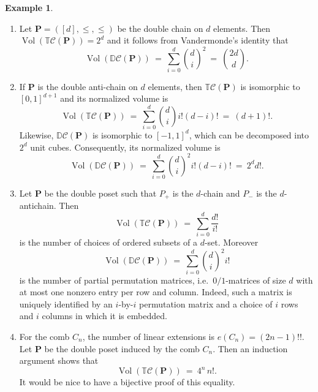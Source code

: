 \documentclass[11pt]{amsart}
\theoremstyle{definition}
\newtheorem{example}{Example}
\begin{document}
\begin{example} ~
    \begin{enumerate}
        \item Let ${\mathbf{P}} = ([d],\le,\le)$ be the double chain on $d$
            elements.  Then $\operatorname{Vol}({{\mathbb{T}}{\mathcal{C}({{{\mathbf{P}}}})}})  = 2^d$ and it follows
            from Vandermonde's identity that 
            \[
            \operatorname{Vol}({\mathbb{D}{\mathcal{C}({{{\mathbf{P}}}})}}) \ = \ 
                \sum_{i=0}^d \binom{d}{i}^2 \ = \ \binom{2d}{d}.
            \]
        \item If ${\mathbf{P}}$ is the double anti-chain on $d$ elements, then
            ${{\mathbb{T}}{\mathcal{C}({{{\mathbf{P}}}})}}$ is isomorphic to $[0,1]^{d+1}$ and its
            normalized volume is
            \[
                \operatorname{Vol}({{\mathbb{T}}{\mathcal{C}({{{\mathbf{P}}}})}}) \ = \  \sum_{i=0}^d \binom{d}{i} i!
                (d-i)! \ = \ (d+1)!.
            \]
            Likewise, ${\mathbb{D}{\mathcal{C}({{{\mathbf{P}}}})}}$ is isomorphic to
            $[-1,1]^d$, which can be decomposed into $2^d$ unit cubes.
            Consequently, its normalized volume is 
            \[
                \operatorname{Vol}({\mathbb{D}{\mathcal{C}({{{\mathbf{P}}}})}})  \ = \ \sum_{i=0}^d \binom{d}{i}^2 i!(d-i)! \ = \ 2^d
            d!.
            \]
        \item Let ${\mathbf{P}}$ be the double poset such that ${P}_+$ is the
            $d$-chain and ${P}_-$ is the $d$-antichain. Then
            \[
                \operatorname{Vol}({{\mathbb{T}}{\mathcal{C}({{{\mathbf{P}}}})}}) \ = \ \sum_{i=0}^d \frac{d!}{i!} 
            \]
            is the number of choices of ordered subsets of a $d$-set.
            Moreover
            \[
                \operatorname{Vol}({\mathbb{D}{\mathcal{C}({{{\mathbf{P}}}})}})  \ = \ \sum_{i=0}^d
                \binom{d}{i}^2 i! 
            \]
            is the number of partial permutation matrices, i.e.\
            $0/1$-matrices of size $d$ with at most one nonzero entry per row
            and column. Indeed, such a matrix is uniquely identified by an
            $i$-by-$i$ permutation matrix and a choice of $i$ rows and $i$
            columns in which it is embedded.
        \item For the comb $C_n$, the number of linear extensions is $e(C_n) =
            (2n-1)!!$. Let ${\mathbf{P}}$ be the double poset induced by the comb
            $C_n$. Then an induction argument shows that
            \[
                \operatorname{Vol}({{\mathbb{T}}{\mathcal{C}({{{\mathbf{P}}}})}}) \ = \ 4^n\, n!.
            \]
            It would be nice to have a bijective proof of this equality.
    \end{enumerate}
\end{example}
\end{document}
